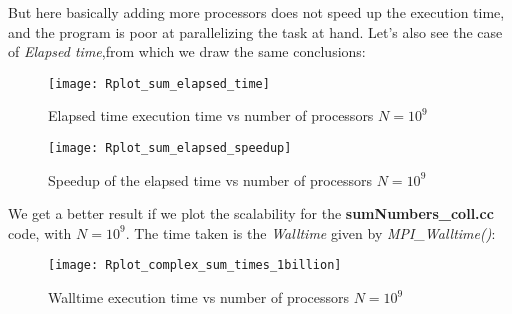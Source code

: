 \documentclass[11pt]{scrartcl} %
\begin{document}
But here basically adding more processors does not speed up the execution time, and the program is poor at parallelizing the task at hand. Let's also see the case of \textit{Elapsed time},from which we draw the same conclusions:

\begin{figure}[H] %
	\centering
	\texttt{[image: Rplot\_sum\_elapsed\_time]} %
	\caption{Elapsed time execution time vs number of processors $N= 10^9$}
\end{figure}

\begin{figure}[H] %
	\centering
	\texttt{[image: Rplot\_sum\_elapsed\_speedup]} %
	\caption{Speedup of the elapsed time vs number of processors $N= 10^9$}
\end{figure}
We get a better result if we plot the scalability for the \textbf{sumNumbers\_coll.cc} code, with $N=10^{9}$. The time taken is the \textit{Walltime} given by \textit{MPI\_Walltime()}:

\begin{figure}[H] %
	\centering
	\texttt{[image: Rplot\_complex\_sum\_times\_1billion]} %
	\caption{Walltime execution time vs number of processors $N= 10^9$}
\end{figure}
\end{document}
